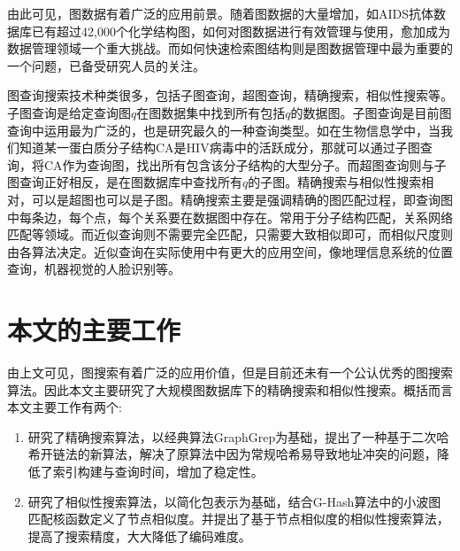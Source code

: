 \documentclass{XDBAthesis}
\begin{document}
由此可见，图数据有着广泛的应用前景。随着图数据的大量增加，如AIDS抗体数据库已有超过42,000个化学结构图，如何对图数据进行有效管理与使用，愈加成为数据管理领域一个重大挑战。而如何快速检索图结构则是图数据管理中最为重要的一个问题，已备受研究人员的关注。

图查询搜索技术种类很多，包括子图查询，超图查询，精确搜索，相似性搜索等\cite{g13}。子图查询是给定查询图$q$在图数据集中找到所有包括$q$的数据图。子图查询是目前图查询中运用最为广泛的，也是研究最久的一种查询类型。如在生物信息学中\cite{g13}，当我们知道某一蛋白质分子结构CA是HIV病毒中的活跃成分，那就可以通过子图查询，将CA作为查询图，找出所有包含该分子结构的大型分子。而超图查询则与子图查询正好相反，是在图数据库中查找所有$q$的子图。精确搜索与相似性搜索相对，可以是超图也可以是子图。精确搜索主要是强调精确的图匹配过程，即查询图中每条边，每个点，每个关系要在数据图中存在。常用于分子结构匹配，关系网络匹配等领域。而近似查询则不需要完全匹配，只需要大致相似即可，而相似尺度则由各算法决定。近似查询在实际使用中有更大的应用空间，像地理信息系统的位置查询，机器视觉的人脸识别等\cite{g13}。

\section{本文的主要工作}
由上文可见，图搜索有着广泛的应用价值，但是目前还未有一个公认优秀的图搜索算法。因此本文主要研究了大规模图数据库下的精确搜索和相似性搜索。概括而言本文主要工作有两个:
\begin{enumerate}
    \item 研究了精确搜索算法，以经典算法GraphGrep\cite{graphgrep}为基础，提出了一种基于二次哈希开链法的新算法，解决了原算法中因为常规哈希易导致地址冲突的问题，降低了索引构建与查询时间，增加了稳定性。
    \item 研究了相似性搜索算法，以简化包表示为基础，结合G-Hash\cite{ghash}算法中的小波图匹配核函数定义了节点相似度。并提出了基于节点相似度的相似性搜索算法，提高了搜索精度，大大降低了编码难度。
\end{enumerate}
\end{document}
